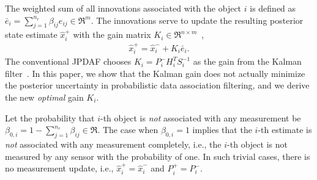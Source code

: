 




The weighted sum of all innovations associated with the object $i$ is defined as ${\bar{e}}_{i}={\sum\limits_{j=1}^{n_r} \beta_{ij}e_{ij}}\in\Re^m$.
The innovations serve to update the resulting posterior state estimate $\hat x^+_{i}$ with the gain matrix $K_i\in\Re^{n\times m}$~\cite{TrackDataAssoc},
\begin{align}
\hat x^+_{i}= \hat x^-_{i}+K_{i}{\bar{e}}_{i}.\label{eqn:KalEst}
\end{align}
The conventional JPDAF chooses $K_i=P^-_iH_i^TS_i^{-1}$ as the gain from the Kalman filter~\cite{TrackDataAssoc}.
In this paper, we show that the Kalman gain does not actually minimize the posterior uncertainty in probabilistic data association filtering, and we derive the new \textit{optimal} gain $K_i$.

Let the probability that $i$-th object is \textit{not} associated with any measurement be $\beta_{0,i}=1-{\sum_{j=1}^{n_r} \beta_{ij}}\in\Re$. The case when $\beta_{0,i}=1$ implies that the $i$-th estimate is \emph{not} associated with any measurement completely, i.e., the $i$-th object is not measured by any sensor with the probability of one. In such trivial cases, there is no measurement update, i.e., $\hat x^+_i=\hat x^-_i$ and $P_i^+=P_i^-$. 

